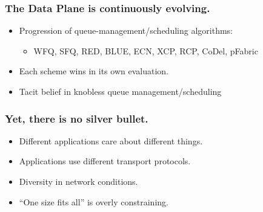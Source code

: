 \begin{frame}[plain]
\frametitle{The Data Plane is continuously evolving.}
\begin{itemize}
\item Progression of queue-management/scheduling algorithms:
\begin{itemize}
\item WFQ, SFQ, RED, BLUE, ECN, XCP, RCP, CoDel, pFabric
\end{itemize}
\item Each scheme wins in its own evaluation.
\item Tacit belief in knobless queue management/scheduling
\end{itemize}
\end{frame}

\begin{frame}[plain]
\frametitle{Yet, there is no silver bullet.}
\begin{itemize}
\item{Different applications care about different things.}

\item{Applications use different transport protocols.}

\item{Diversity in network conditions.}
\item{``One size fits all'' is overly constraining.}
\end{itemize}
\end{frame}

